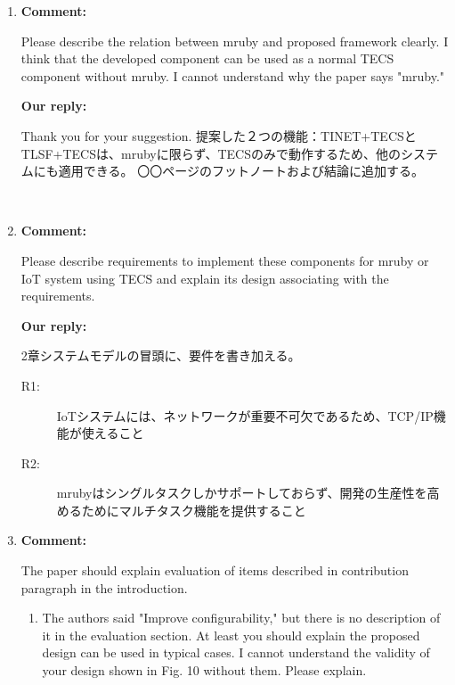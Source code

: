 \documentclass{article}
\begin{document}
\begin{enumerate}

\item \begin{flushleft}
\textbf{Comment:}

Please describe the relation between mruby and proposed framework clearly. I think that the developed component can be used as a normal TECS component without mruby. I cannot understand why the paper says "mruby." 
\end{flushleft}

\begin{flushleft}
\textbf{Our reply:}

Thank you for your suggestion.
提案した２つの機能：TINET+TECSとTLSF+TECSは、mrubyに限らず、TECSのみで動作するため、他のシステムにも適用できる。
〇〇ページのフットノートおよび結論に追加する。
\begin{itembox}[|]{}
\end{itembox}\\
\end{flushleft}


\item \begin{flushleft}
\textbf{Comment:}

Please describe requirements to implement these components for mruby or IoT system using TECS and explain its design associating with the requirements. 
\end{flushleft}

\begin{flushleft}
\textbf{Our reply:}

2章システムモデルの冒頭に、要件を書き加える。
\begin{description}
    \item[R1:] IoTシステムには、ネットワークが重要不可欠であるため、TCP/IP機能が使えること
    \item[R2:] mrubyはシングルタスクしかサポートしておらず、開発の生産性を高めるためにマルチタスク機能を提供すること
\end{description}
\end{flushleft}

\item \begin{flushleft}
\textbf{Comment:}

The paper should explain evaluation of items described in contribution paragraph in the introduction. 

\begin{enumerate}
\item The authors said "Improve configurability," but there is no description of it in the evaluation section.  At least you should explain the proposed design can be used in typical cases. I cannot understand the validity of your design shown in Fig. 10 without them.  Please explain.


\end{enumerate}
\end{flushleft}
\end{enumerate}
\end{document}
